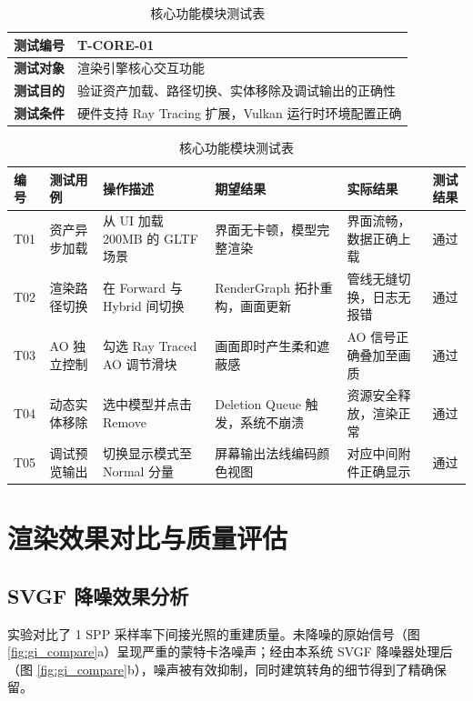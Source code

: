 \begin{table}[H]
\centering
\caption{核心功能模块测试表}
\label{tab:test_cases_detailed}
\begin{tabular}{|p{2cm}|p{10cm}|}
\hline
\textbf{测试编号} & T-CORE-01 \\ \hline
\textbf{测试对象} & 渲染引擎核心交互功能 \\ \hline
\textbf{测试目的} & 验证资产加载、路径切换、实体移除及调试输出的正确性 \\ \hline
\textbf{测试条件} & 硬件支持 Ray Tracing 扩展，Vulkan 运行时环境配置正确 \\ \hline
\end{tabular}

\vspace{0.2cm}

\begin{tabular}{|l|l|p{2.5cm}|p{2.5cm}|p{2.5cm}|l|}
\hline
\textbf{编号} & \textbf{测试用例} & \textbf{操作描述} & \textbf{期望结果} & \textbf{实际结果} & \textbf{测试结果} \\ \hline
T01 & 资产异步加载 & 从 UI 加载 200MB 的 GLTF 场景 & 界面无卡顿，模型完整渲染 & 界面流畅，数据正确上载 & 通过 \\ \hline
T02 & 渲染路径切换 & 在 Forward 与 Hybrid 间切换 & RenderGraph 拓扑重构，画面更新 & 管线无缝切换，日志无报错 & 通过 \\ \hline
T03 & AO 独立控制 & 勾选 Ray Traced AO 调节滑块 & 画面即时产生柔和遮蔽感 & AO 信号正确叠加至画质 & 通过 \\ \hline
T04 & 动态实体移除 & 选中模型并点击 Remove & Deletion Queue 触发，系统不崩溃 & 资源安全释放，渲染正常 & 通过 \\ \hline
T05 & 调试预览输出 & 切换显示模式至 Normal 分量 & 屏幕输出法线编码颜色视图 & 对应中间附件正确显示 & 通过 \\ \hline
\end{tabular}
\end{table}

\section{渲染效果对比与质量评估}

\subsection{SVGF 降噪效果分析}
实验对比了 1 SPP 采样率下间接光照的重建质量。未降噪的原始信号（图 \ref{fig:gi_compare}a）呈现严重的蒙特卡洛噪声；经由本系统 SVGF 降噪器处理后（图 \ref{fig:gi_compare}b），噪声被有效抑制，同时建筑转角的细节得到了精确保留。

